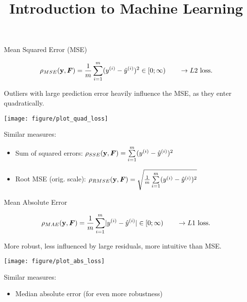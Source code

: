 \documentclass[11pt,compress,t,notes=noshow, xcolor=table]{beamer}
\title{Introduction to Machine Learning}
\institute{\href{https://compstat-lmu.github.io/lecture_i2ml/}{compstat-lmu.github.io/lecture\_i2ml}}
\date{}
\begin{document}
\sloppy


\begin{vbframe}{Mean Squared Error (MSE)}

$$
\rho_{MSE}(\mathbf{y}, \boldsymbol{F}) = \frac{1}{m} \sum\limits_{i=1}^m (y^{(i)}- \hat{y}^{(i)})^2 \in [0;\infty) \qquad \rightarrow L2 \text{ loss}.
$$

\begin{minipage}[c]{0.33\textwidth}
  \raggedright
  \small
  Outliers with large prediction error heavily influence the MSE, as they
  enter quadratically.
\end{minipage}%
\begin{minipage}[c]{0.67\textwidth}
  \scriptsize
  \color{fgcolor}
  {\texttt{[image: figure/plot\_quad\_loss]}}

\end{minipage}

\small
Similar measures:

\begin{itemize}
  \small
  \item Sum of squared errors: $\rho_{SSE}(\mathbf{y}, \boldsymbol{F})=\sum\limits_{i=1}^m (y^{(i)}- \hat{y}^{(i)})^2$
  \item Root MSE (orig. scale): $\rho_{RMSE}(\mathbf{y}, \boldsymbol{F})= \sqrt{\frac{1}{m} \sum\limits_{i=1}^m (y^{(i)}- \hat{y}^{(i)})^2}$
\end{itemize}

\end{vbframe}


\begin{vbframe}{Mean Absolute Error}

$$
\rho_{MAE}(\mathbf{y}, \boldsymbol{F}) = \frac{1}{m} \sum\limits_{i=1}^m \rvert y^{(i)}- \hat{y}^{(i)} \rvert \in [0;\infty) \qquad \rightarrow L1
\text{ loss}.
$$

\begin{minipage}[c]{0.33\textwidth}
  \raggedright
  \small
  More robust, less influenced by large residuals, more intuitive than MSE.
\end{minipage}%
\begin{minipage}[c]{0.67\textwidth}
  \scriptsize
  \color{fgcolor}
  {\texttt{[image: figure/plot\_abs\_loss]}}

\end{minipage}

\small
Similar measures:

\begin{itemize}
  \small
  \item Median absolute error (for even more robustness)
\end{itemize}

\end{vbframe}
\end{document}
